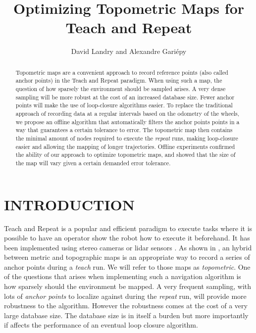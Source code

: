 \documentclass[letterpaper,10 pt,conference]{ieeeconf}
\title{\LARGE \bf
  Optimizing Topometric Maps for Teach and Repeat
}
\author{David Landry and Alexandre Gari\'epy}
\begin{document}
\maketitle
\thispagestyle{empty}
\pagestyle{empty}


\begin{abstract} Topometric maps are a convenient approach to record reference
points (also called anchor points) in the Teach and Repeat paradigm. When using
such a map, the question of how sparsely the environment should be sampled
arises. A very dense sampling will be more robust at the cost of an increased
database size. Fewer anchor points will make the use of loop-closure algorithms
easier. To replace the traditional approach of recording data at a regular
intervals based on the odometry of the wheels, we propose an offline algorithm
that automatically filters the anchor points points in a way that guarantees a
certain tolerance to error. The topometric map then contains the minimal amount
of nodes required to execute the \textit{repeat} runs, making loop-closure
easier and allowing the mapping of longer trajectories. Offline experiments
confirmed the ability of our approach to optimize topometric maps, and showed
that the size of the map will vary given a certain demanded error tolerance.
\end{abstract}

\section{INTRODUCTION}

Teach and Repeat is a popular and efficient paradigm to execute tasks where it
is possible to have an operator show the robot how to execute it beforehand. It
has been implemented using stereo cameras \cite{Furgale10} or lidar sensors
\cite{Sprunk13}. As shown in \cite{Furgale10}, an hybrid between metric and
topographic maps is an appropriate way to record a series of anchor points
during a \textit{teach} run. We will refer to those maps as \textit{topometric}.
One of the questions that arises when implementing such a navigation algorithm
is how sparsely should the environment be mapped. A very frequent sampling, with
lots of \textit{anchor points} to localize against during the \textit{repeat}
run, will provide more robustness to the algorithm. However the robustness comes
at the cost of a very large database size. The database size is in itself a
burden but more importantly if affects the performance of an eventual loop
closure algorithm.
\end{document}
